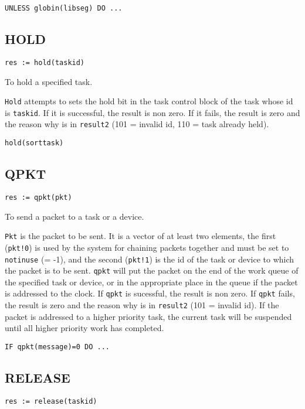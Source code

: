 \verb|UNLESS globin(libseg) DO ...|


\subsection{HOLD}

\verb|res := hold(taskid)|

  To hold a specified task.


     \verb|Hold| attempts to sets the hold bit in the task control
block of the task whose id is \verb|taskid|.  If it is successful, the
result is non zero.  If it fails, the result is zero and the reason
why is in \verb|result2| (101 = invalid id, 110 = task already held).

\verb|hold(sorttask)|


\subsection{QPKT}

\verb|res := qpkt(pkt)|

  To send a packet to a task or a device.


     \verb|Pkt| is the packet to be sent. It is a vector of at least
two elements, the first (\verb|pkt!0|) is used by the system for
chaining packets together and must be set to \verb|notinuse| (= -1),
and the second (\verb|pkt!1|) is the id of the task or device to which
the packet is to be sent.  \verb|qpkt| will put the packet on the end
of the work queue of the specified task or device, or in the
appropriate place in the queue if the packet is addressed to the
clock.  If \verb|qpkt| is sucessful, the result is non zero.  If
\verb|qpkt| fails, the result is zero and the reason why is in
\verb|result2| (101 = invalid id).  If the packet is addressed to a
higher priority task, the current task will be suspended until all
higher priority work has completed.

\verb|IF qpkt(message)=0 DO ...|


\subsection{RELEASE}

\verb|res := release(taskid)|

